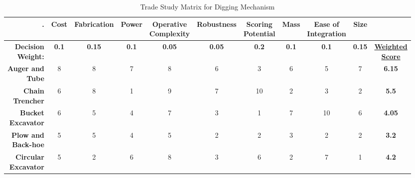 \documentclass[class=article, crop=false]{standalone}
\begin{document}
\FloatBarrier
	\begin{table}[h]
	\scriptsize
	\centering
	\begin{tabular}{ | r | c | c | c | c | c | c | c | c | c | c |}
 	\hline
 		\rowcolor[gray]{0.8}
 		\textbf{.} &\textbf{Cost} &\textbf{Fabrication} &\textbf{Power} &\makecell{\textbf{Operative} \\ \textbf{Complexity}} &\textbf{Robustness} &\makecell{\textbf{Scoring} \\ \textbf{Potential}} &\textbf{Mass} & \makecell{\textbf{Ease of} \\ \textbf{Integration}} &\textbf{Size} &  \\ 
 		\hline
		\makecell{\textbf{Decision} \\ \textbf{Weight:}}& \textbf{0.1} &\textbf{0.15} &\textbf{0.1} &\textbf{0.05} &\textbf{0.05} &\textbf{0.2} &
		\textbf{0.1} &\textbf{0.1}  &\textbf{0.15} &\makecell{\textbf{\underline{Weighted}} \\ \textbf{\underline{Score}}}  \\ 
 		\hline\hline
 		\makecell{\textbf{Auger and} \\ \textbf{Tube}}    & 8 & 8 & 7 & 8 & 6 & 3 & 6 & 5 & 7 & \textbf{6.15} \\ 
 		\hline
 		\makecell{\textbf{Chain} \\ \textbf{Trencher}}    & 6 & 8 & 1 & 9 & 7 & 10 & 2 & 3 & 2 & \textbf{5.5} \\
 		\hline
 		\makecell{\textbf{Bucket} \\ \textbf{Excavator}}  & 6 & 5 & 4 & 7 & 3 & 1 & 7 & 10 & 6 & \textbf{4.05} \\
 		\hline
 		\makecell{\textbf{Plow and} \\ \textbf{Back-hoe}} & 5 & 5 & 4 & 5 & 2 & 2 & 3 & 2 & 2 & \textbf{3.2} \\
 		\hline
 		\makecell{\textbf{Circular} \\ \textbf{Excavator}}& 5 & 2 & 6 & 8 & 3 & 6 & 2 & 7 & 1 & \textbf{4.2} \\ 
 		\hline
	\end{tabular}
	\caption{Trade Study Matrix for Digging Mechanism}
		\label{table:dig-trade-study}
	\end{table}
	\FloatBarrier
	
	
\end{document}
